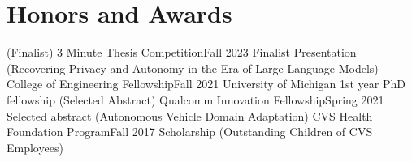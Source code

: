 \section{Honors and Awards}
  \CVSubHeadingListStart
    \CVSubheading
      {(Finalist) 3 Minute Thesis Competition}{Fall 2023}
      {Finalist Presentation (Recovering Privacy and Autonomy in the Era of Large Language Models)}{}
    \CVSubheading
      {College of Engineering Fellowship}{Fall 2021}
      {University of Michigan 1st year PhD fellowship}{}
    \CVSubheading
      {(Selected Abstract) Qualcomm Innovation Fellowship}{Spring 2021}
      {Selected abstract (Autonomous Vehicle Domain Adaptation)}{}
    \CVSubheading
      {CVS Health Foundation Program}{Fall 2017}
      {Scholarship (Outstanding Children of CVS Employees)}{}
  \CVSubHeadingListEnd